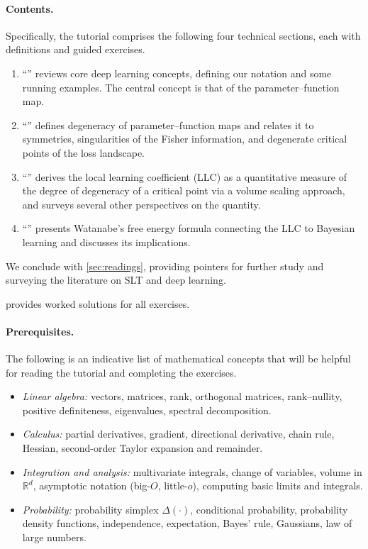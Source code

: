 \documentclass[11pt]{article}
\newcommand{\R}{\mathbb{R}}
\begin{document}
\paragraph{Contents.} Specifically, the tutorial comprises the following four
technical sections, each with definitions and guided exercises.
\begin{enumerate}
    \item
        ``'' reviews core deep learning concepts, defining
        our notation and some running examples. The central concept is that of
        the parameter--function map.
    \item
        ``'' defines degeneracy of parameter--function
        maps and relates it to symmetries, singularities of the Fisher
        information, and degenerate critical points of the loss landscape.
    \item
        ``'' derives the local learning coefficient (LLC) as a
        quantitative measure of the degree of degeneracy of a critical point
        via a volume scaling approach, and surveys several other perspectives
        on the quantity.
    \item
        ``'' presents Watanabe's free energy formula
        connecting the LLC to Bayesian learning and discusses its implications.
\end{enumerate}
We conclude with \cref{sec:readings}, providing pointers for further study and
surveying the literature on SLT and deep learning.
\begin{pdfonly}
\begin{solutionsonly}
provides worked solutions for all exercises.
\end{solutionsonly}
\end{pdfonly}
\paragraph{Prerequisites.}

The following is an indicative list of mathematical concepts that will be
helpful for reading the tutorial and completing the exercises.

\begin{itemize}
    \item
        \emph{Linear algebra:} vectors, matrices, rank, orthogonal matrices,
        rank--nullity, positive definiteness, eigenvalues, spectral decomposition.
    \item
        \emph{Calculus:} partial derivatives, gradient, directional derivative,
        chain rule, Hessian, second-order Taylor expansion and remainder.
    \item
        \emph{Integration and analysis:} multivariate integrals, change of
        variables, volume in $\R^d$, asymptotic notation (big-$O$, little-$o$),
        computing basic limits and integrals.
    \item
        \emph{Probability:} probability simplex $\Delta(\cdot)$, conditional
        probability, probability density functions, independence, expectation,
        Bayes' rule, Gaussians, law of large numbers.
\end{itemize}
\end{document}
